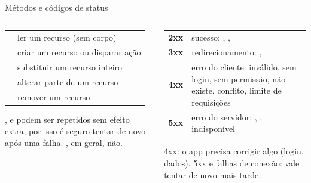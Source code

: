 \documentclass[aspectratio=169,10pt]{beamer}
\begin{document}
\begin{frame}{Métodos e códigos de status}
  \begin{columns}[T]
    \begin{column}{0.46\textwidth}
      \footnotesize
      \begin{tabularx}{\linewidth}{@{}l L@{}}
        \toprule
         &  \\
        \midrule
         & ler um recurso (sem corpo) \\
         & criar um recurso ou disparar ação \\
         & substituir um recurso inteiro \\
         & alterar parte de um recurso \\
         & remover um recurso \\
        \bottomrule
      \end{tabularx}
      \begin{conceito}[Idempotência]
        ,  e  podem ser repetidos sem efeito extra, por isso é seguro tentar de novo após uma falha. , em geral, não.
      \end{conceito}
    \end{column}
    \begin{column}{0.52\textwidth}
      \footnotesize
      \begin{tabularx}{\linewidth}{@{}l L@{}}
        \toprule
         &  \\
        \midrule
        \textcolor{verdeok}{\textbf{2xx}} & sucesso: , ,  \\
        \textbf{3xx} & redirecionamento: ,  \\
        \textcolor{ambar}{\textbf{4xx}} & erro do cliente:  inválido,  sem login,  sem permissão,  não existe,  conflito,  limite de requisições \\
        \textcolor{vermelhoerro}{\textbf{5xx}} & erro do servidor: , ,  indisponível \\
        \bottomrule
      \end{tabularx}
      \begin{dica}
        4xx: o app precisa corrigir algo (login, dados). 5xx e falhas de conexão: vale tentar de novo mais tarde.
      \end{dica}
    \end{column}
  \end{columns}
\end{frame}
\end{document}
